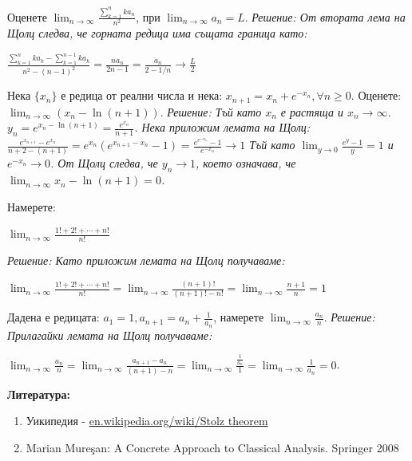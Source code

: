 \documentclass[12pt]{article}
\begin{document}
\begin{example}
Оценете \(\displaystyle\lim_{n \to \infty}\frac{\sum_{k = 1}^nka_n}{n^2}\), при \(\displaystyle\lim_{n \to \infty}a_n = L\).
\newline
\it{Решение:} От втората лема на Щолц следва, че горната редица има същата граница като:
\begin{center}
\(\displaystyle\frac{\sum_{k = 1}^n ka_k - \sum_{k = 1}^{n - 1} ka_k}{n^2 - (n - 1)^2} = \frac{na_n}{2n - 1} = \frac{a_n}{2 - 1/n} \to \frac{L}{2}\)
\end{center}
\end{example}

\begin{example}
Нека \(\{x_n\}\) е редица от реални числа и нека:
\(x_{n + 1} = x_n + e^{-x_n}, \forall n \geq 0.\)
\newline
Оценете: \(\displaystyle\lim_{n\to\infty} (x_n - \ln(n+1))\).
\newline
\it{Решение:} Тъй като \(x_n\) е растяща и \(x_n \to \infty\).
 \(\displaystyle y_n=e^{x_n-\ln(n+1)}=\frac{e^{x_n}}{n+1}\).
Нека приложим лемата на Щолц:
\newline
\(\displaystyle\frac{e^{x_{n+1}}-e^{x_n}}{n+2-(n+1)}=e^{x_n}(e^{x_{n+1}-x_n}-1)=\frac{e^{e^{-x_n}}-1}{e^{-x_n}}\to 1\)
\newline
Тъй като \(\displaystyle \lim_{y\to 0}\frac{e^y-1}{y}=1\) и \(e^{-x_n}\to 0\).
\newline
От Щолц следва, че \(y_n \to 1\), което означава, че \(\displaystyle\lim_{n \to \infty}x_n-\ln(n+1)= 0\).
\end{example}

\begin{example}
Намерете:
\begin{center}
\(\displaystyle\lim_{n\to\infty}\frac{1!+2!+\cdots+n!}{n!}\)
\end{center}
\it{Решение:}
Като приложим лемата на Щолц получаваме:
\begin{center}
\(\displaystyle\lim_{n\to\infty}\frac{1!+2!+\cdots+n!}{n!}=\lim_{n\to\infty}\frac{(n+1)!}{(n+1)!-n!}=\lim_{n\to\infty}\frac{n+1}{n}=1\)
\end{center}
\end{example}

\begin{example}
Дадена е редицата: \(\displaystyle a_1 = 1, a_{n+1} = a_n + \frac{1}{a_n}\), намерете
\(\displaystyle\lim_{n \to \infty}\frac{a_n}{n}\).
\it{Решение:}
Прилагайки лемата на Щолц получаваме:
\begin{center}
\(\displaystyle\lim_{n\to \infty} \frac{a_n}{n}=\lim_{n\to\infty} \frac{a_{n+1}-a_{n}}{(n+1)-n}=\lim_{n\to \infty}\frac{\frac{1}{a_{n}}}{1}=\lim_{n\to \infty}\frac{1}{a_{n}}=0\).
\end{center}
\end{example}

\newpage
\bf{Литература:}
\begin{enumerate}
    \item Уикипедия - \href{https://en.wikipedia.org/wiki/Stolz\%E2\%80\%93Ces\%C3\%A0ro_theorem}{en.wikipedia.org/wiki/Stolz theorem}
    \item Marian Mureşan: A Concrete Approach to Classical Analysis. Springer 2008
\end{enumerate}
\end{document}
